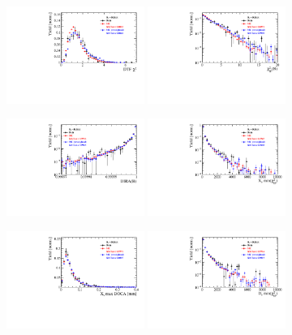 \begin{figure}[h]
\centering
\includegraphics[height=!,width=0.4\textwidth]{figs/dataVsMC/signal_final/combined/Ds2KKpi_1_DTF_CHI2NDOF.pdf}
\includegraphics[height=!,width=0.4\textwidth]{figs/dataVsMC/signal_final/combined/Ds2KKpi_1_Bs_IPCHI2_OWNPV.pdf}

\includegraphics[height=!,width=0.4\textwidth]{figs/dataVsMC/signal_final/combined/Ds2KKpi_1_Bs_DIRA_OWNPV.pdf}
\includegraphics[height=!,width=0.4\textwidth]{figs/dataVsMC/signal_final/combined/Ds2KKpi_1_XsDaughters_min_IPCHI2.pdf}

\includegraphics[height=!,width=0.4\textwidth]{figs/dataVsMC/signal_final/combined/Ds2KKpi_1_Xs_max_DOCA.pdf}
\includegraphics[height=!,width=0.4\textwidth]{figs/dataVsMC/signal_final/combined/Ds2KKpi_1_DsDaughters_min_IPCHI2.pdf}


\end{figure}
